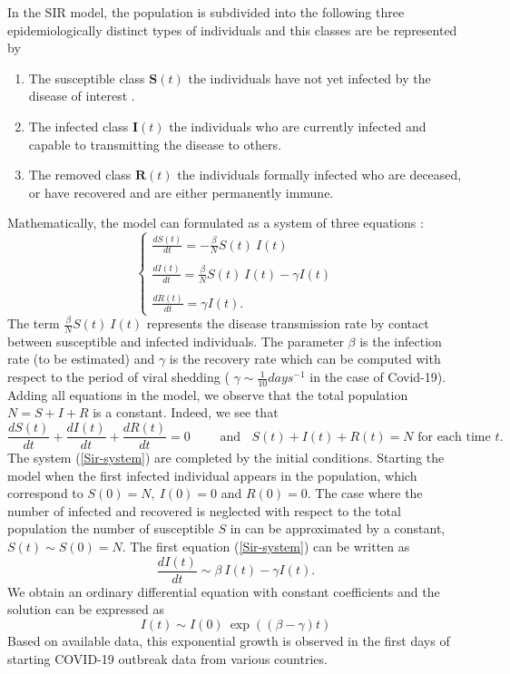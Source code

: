 \documentclass[final,a4paper,reqno]{elsarticle}
\numberwithin{equation}{section}
\begin{document}
\noindent In the SIR model, the population
is subdivided into the following three epidemiologically distinct types of individuals and  this classes are be represented by
\begin{enumerate}
\item   The susceptible class $\textbf{S}(t)$  the individuals  have not yet  infected by
the disease of interest . 
\item  The infected class $\textbf{I}(t)$ the individuals who
are currently infected and capable to transmitting the disease to others. 
\item The removed class $\textbf{R}(t)$ the individuals  formally infected
who are deceased, or have recovered and are either permanently immune.
\end{enumerate}
Mathematically, the model can formulated as a system of three equations  \cite{KeMc}:
\begin{equation}\label{Sir-system}
\begin{cases}
\displaystyle \frac{ dS(t)}{dt} = -\frac{\beta}{N} S(t) \: I(t)\\ \\
\displaystyle  \frac{ dI(t)}{dt}  = \frac{\beta}{N} S(t) \: I(t) -\gamma I(t)\\  \\
\displaystyle  \frac{ dR(t)}{dt} = \gamma I(t). 
\end{cases}
\end{equation}
 The term $\frac{\beta}{N} S(t) \: I(t)$ represents the disease transmission rate by contact between susceptible and infected individuals.  The parameter  $\beta$ is the infection rate (to be estimated) and $\gamma$ is the recovery rate which can be computed with respect to the period of viral shedding ( $\gamma\sim \frac{1}{10} days^{-1}$ in the case of Covid-19). Adding all equations in the model, we observe that  the total population  $N=S+I+R$ is a constant. Indeed, we see that   
$$ \displaystyle \frac{ dS(t)}{dt} +   \frac{ dI(t)}{dt}  +  \frac{ dR(t)}{dt} = 0 \qquad \mbox{ and }\;\;  S(t)+I(t)+R(t)=N \mbox{ for each time  } t.$$ 
The system (\ref{Sir-system}) are completed by the initial conditions. Starting the model when the first infected
individual appears in the population, which  correspond to 
$ \displaystyle S(0)=N,  \: I(0)=0$ and  $R(0)=0$. The case where the number  of infected and recovered is neglected with respect to the total population the number of susceptible $S$ in can be approximated by a constant, $ S(t) \sim S(0)=N$. The first  equation (\ref{Sir-system}) can be written as 
  \begin{equation}\label{Sir-simplified}
\displaystyle  \frac{ dI(t)}{dt}  \sim \beta \: I(t) -\gamma I(t).
\end{equation}
We obtain an ordinary differential equation with constant coefficients and the solution can be expressed as
\begin{equation}\label{Sir-sol}
\displaystyle  I(t)  \sim I(0) \: \exp((\beta-\gamma)t)
\end{equation}
Based on available data, this exponential growth is observed in the first days of  starting COVID-19 outbreak data from various countries.
\end{document}
